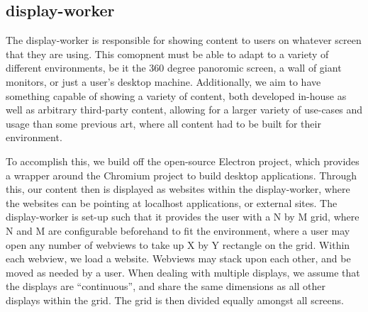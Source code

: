 \subsection{display-worker}

The display-worker is responsible for showing content to users on whatever screen that they are using.
This comopnent must be able to adapt to a variety of different environments, be it the 360 degree
panoromic screen, a wall of giant monitors, or just a user's desktop machine. Additionally, we aim to
have something capable of showing a variety of content, both developed in-house as well as arbitrary
third-party content, allowing for a larger variety of use-cases and usage than some previous art, where
all content had to be built for their environment.

To accomplish this, we build off the open-source Electron project, which provides a wrapper around the
Chromium project to build desktop applications. Through this, our content then is displayed as websites
within the display-worker, where the websites can be pointing at localhost applications, or external
sites. The display-worker is set-up such that it provides the user with a N by M grid, where N and M are
configurable beforehand to fit the environment, where a user may open any number of webviews to take
up X by Y rectangle on the grid. Within each webview, we load a website. Webviews may stack upon each
other, and be moved as needed by a user. When dealing with multiple displays, we assume that the displays
are ``continuous'', and share the same dimensions as all other displays within the grid. The grid is then
divided equally amongst all screens.
